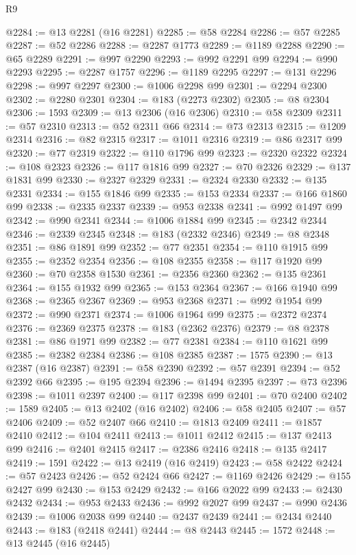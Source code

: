 \begin{lexlean}{R9}
\begin{coremodule}
@2284 := @13 @2281 (@16 @2281)
@2285 := @58 @2284
@2286 := @57 @2285
@2287 := @52 @2286
@2288 := @2287 @1773
@2289 := @1189 @2288
@2290 := @65 @2289
@2291 := @997 @2290
@2293 := @992 @2291 @99
@2294 := @990 @2293
@2295 := @2287 @1757
@2296 := @1189 @2295
@2297 := @131 @2296
@2298 := @997 @2297
@2300 := @1006 @2298 @99
@2301 := @2294 @2300
@2302 := @2280 @2301
@2304 := @183 (@2273 @2302)
@2305 := @8 @2304
@2306 := 1593
@2309 := @13 @2306 (@16 @2306)
@2310 := @58 @2309
@2311 := @57 @2310
@2313 := @52 @2311 @66
@2314 := @73 @2313
@2315 := @1209 @2314
@2316 := @82 @2315
@2317 := @1011 @2316
@2319 := @86 @2317 @99
@2320 := @77 @2319
@2322 := @110 @1796 @99
@2323 := @2320 @2322
@2324 := @108 @2323
@2326 := @117 @1816 @99
@2327 := @70 @2326
@2329 := @137 @1831 @99
@2330 := @2327 @2329
@2331 := @2324 @2330
@2332 := @135 @2331
@2334 := @155 @1846 @99
@2335 := @153 @2334
@2337 := @166 @1860 @99
@2338 := @2335 @2337
@2339 := @953 @2338
@2341 := @992 @1497 @99
@2342 := @990 @2341
@2344 := @1006 @1884 @99
@2345 := @2342 @2344
@2346 := @2339 @2345
@2348 := @183 (@2332 @2346)
@2349 := @8 @2348
@2351 := @86 @1891 @99
@2352 := @77 @2351
@2354 := @110 @1915 @99
@2355 := @2352 @2354
@2356 := @108 @2355
@2358 := @117 @1920 @99
@2360 := @70 @2358 @1530
@2361 := @2356 @2360
@2362 := @135 @2361
@2364 := @155 @1932 @99
@2365 := @153 @2364
@2367 := @166 @1940 @99
@2368 := @2365 @2367
@2369 := @953 @2368
@2371 := @992 @1954 @99
@2372 := @990 @2371
@2374 := @1006 @1964 @99
@2375 := @2372 @2374
@2376 := @2369 @2375
@2378 := @183 (@2362 @2376)
@2379 := @8 @2378
@2381 := @86 @1971 @99
@2382 := @77 @2381
@2384 := @110 @1621 @99
@2385 := @2382 @2384
@2386 := @108 @2385
@2387 := 1575
@2390 := @13 @2387 (@16 @2387)
@2391 := @58 @2390
@2392 := @57 @2391
@2394 := @52 @2392 @66
@2395 := @195 @2394
@2396 := @1494 @2395
@2397 := @73 @2396
@2398 := @1011 @2397
@2400 := @117 @2398 @99
@2401 := @70 @2400
@2402 := 1589
@2405 := @13 @2402 (@16 @2402)
@2406 := @58 @2405
@2407 := @57 @2406
@2409 := @52 @2407 @66
@2410 := @1813 @2409
@2411 := @1857 @2410
@2412 := @104 @2411
@2413 := @1011 @2412
@2415 := @137 @2413 @99
@2416 := @2401 @2415
@2417 := @2386 @2416
@2418 := @135 @2417
@2419 := 1591
@2422 := @13 @2419 (@16 @2419)
@2423 := @58 @2422
@2424 := @57 @2423
@2426 := @52 @2424 @66
@2427 := @1169 @2426
@2429 := @155 @2427 @99
@2430 := @153 @2429
@2432 := @166 @2022 @99
@2433 := @2430 @2432
@2434 := @953 @2433
@2436 := @992 @2027 @99
@2437 := @990 @2436
@2439 := @1006 @2038 @99
@2440 := @2437 @2439
@2441 := @2434 @2440
@2443 := @183 (@2418 @2441)
@2444 := @8 @2443
@2445 := 1572
@2448 := @13 @2445 (@16 @2445)

\end{coremodule}
\end{lexlean}
